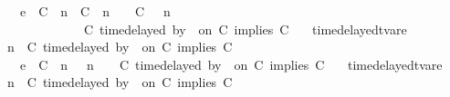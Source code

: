 \begin{isabellebody}
\ \ \ \ \ {\isasymhookrightarrow}\isactrlsub e\ \ {\isacharparenleft}{\isacharparenleft}{\isacharparenleft}C\ {\isasymUp}\ n{\isacharparenright}\ {\isacharhash}\ {\isacharparenleft}C\ {\isacharat}\ n\ {\isasymoplus}\ {\isasymdelta}{\isasymtau}\ {\isasymRightarrow}\ C\ {\isacharhash}\ {\isasymGamma}{\isacharparenright}{\isacharcomma}\ n\isanewline
\ \ \ \ \ \ \ \ \ \ \ \ {\isasymturnstile}\ {\isasymPsi}\ {\isasymtriangleright}\ {\isacharparenleft}{\isacharparenleft}C\ time{\isacharminus}delayed\ by\ {\isasymdelta}{\isasymtau}\ on\ C\ implies\ C\ {\isacharhash}\ {\isasymPhi}{\isacharparenright}{\isacharparenright}{\isacartoucheclose}\isanewline
\isanewline
{\isacharbar}\ timedelayed{\isacharunderscore}tvar{\isacharunderscore}e{}{\isacharcolon}\isanewline
\ \ {\isacartoucheopen}{\isacharparenleft}{\isasymGamma}{\isacharcomma}\ n\ {\isasymturnstile}\ {\isacharparenleft}{\isacharparenleft}C\ time{\isacharminus}delayed{\isasymbowtie}\ by\ {\isasymdelta}{\isasymtau}\ on\ C\ implies\ C\ {\isacharhash}\ {\isasymPsi}{\isacharparenright}\ {\isasymtriangleright}\ {\isasymPhi}{\isacharparenright}\isanewline
\ \ \ \ \ {\isasymhookrightarrow}\isactrlsub e\ \ {\isacharparenleft}{\isacharparenleft}{\isacharparenleft}C\ {\isasymnot}{\isasymUp}\ n{\isacharparenright}\ {\isacharhash}\ {\isasymGamma}{\isacharparenright}{\isacharcomma}\ n\ {\isasymturnstile}\ {\isasymPsi}\ {\isasymtriangleright}\ {\isacharparenleft}{\isacharparenleft}C\ time{\isacharminus}delayed{\isasymbowtie}\ by\ {\isasymdelta}{\isasymtau}\ on\ C\ implies\ C\ {\isacharhash}\ {\isasymPhi}{\isacharparenright}{\isacharparenright}{\isacartoucheclose}\isanewline
{\isacharbar}\ timedelayed{\isacharunderscore}tvar{\isacharunderscore}e{}{\isacharcolon}\isanewline
\ \ {\isacartoucheopen}{\isacharparenleft}{\isasymGamma}{\isacharcomma}\ n\ {\isasymturnstile}\ {\isacharparenleft}{\isacharparenleft}C\ time{\isacharminus}delayed{\isasymbowtie}\ by\ {\isasymdelta}{\isasymtau}\ on\ C\ implies\ C\ {\isacharhash}\ {\isasymPsi}{\isacharparenright}\ {\isasymtriangleright}\ {\isasymPhi}{\isacharparenright}\isanewline

\end{isabellebody}
